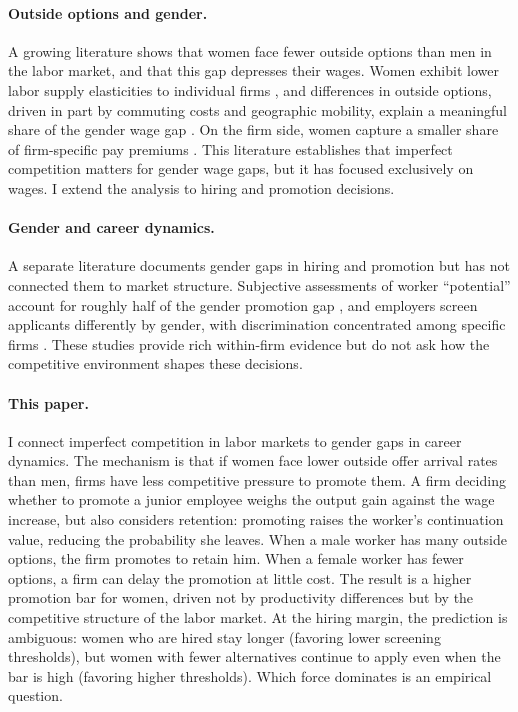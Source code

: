\documentclass[11pt]{article}
\begin{document}
\paragraph{Outside options and gender.}
A growing literature shows that women face fewer outside options than men in the labor market, and that this gap depresses their wages. Women exhibit lower labor supply elasticities to individual firms \citep{webber_firm-level_2016, sharma_monopsony_2023}, and differences in outside options, driven in part by commuting costs and geographic mobility, explain a meaningful share of the gender wage gap \citep{caldwell_outside_nodate, morchio_gender_2024, caldwell_gender_2022}. On the firm side, women capture a smaller share of firm-specific pay premiums \citep{card_bargaining_2016}. This literature establishes that imperfect competition matters for gender wage gaps, but it has focused exclusively on wages. I extend the analysis to hiring and promotion decisions.

\paragraph{Gender and career dynamics.}
A separate literature documents gender gaps in hiring and promotion but has not connected them to market structure. Subjective assessments of worker ``potential'' account for roughly half of the gender promotion gap \citep{benson_potential_2026}, and employers screen applicants differently by gender, with discrimination concentrated among specific firms \citep{bertrand_are_2004, kline_systemic_2022}. These studies provide rich within-firm evidence but do not ask how the competitive environment shapes these decisions. %

\paragraph{This paper.}
I connect imperfect competition in labor markets to gender gaps in career dynamics. The mechanism is that if women face lower outside offer arrival rates than men, firms have less competitive pressure to promote them. A firm deciding whether to promote a junior employee weighs the output gain against the wage increase, but also considers retention: promoting raises the worker's continuation value, reducing the probability she leaves. When a male worker has many outside options, the firm promotes to retain him. When a female worker has fewer options, a firm can delay the promotion at little cost. The result is a higher promotion bar for women, driven not by productivity differences but by the competitive structure of the labor market. At the hiring margin, the prediction is ambiguous: women who are hired stay longer (favoring lower screening thresholds), but women with fewer alternatives continue to apply even when the bar is high (favoring higher thresholds). Which force dominates is an empirical question.
\end{document}

